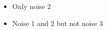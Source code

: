 \documentclass[a4paper]{scrartcl}
\begin{document}
\begin{enumerate}
\begin{itemize}
				\item Only noise 2
				
				\item Noise 1 and 2 but not noise 3
			\end{itemize}
		
		
		
	\end{enumerate}
\end{document}
